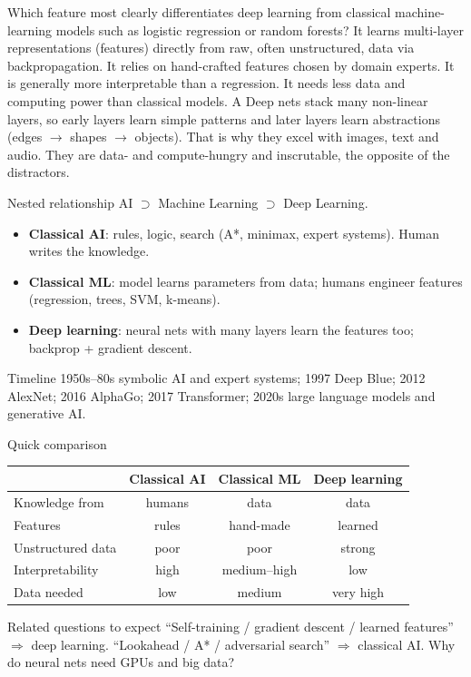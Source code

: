 {Which feature most clearly differentiates deep learning from classical machine-learning models such as logistic regression or random forests?}
{It learns multi-layer representations (features) directly from raw, often unstructured, data via backpropagation.}
{It relies on hand-crafted features chosen by domain experts.}
{It is generally more interpretable than a regression.}
{It needs less data and computing power than classical models.}
{A}
{Deep nets stack many non-linear layers, so early layers learn simple patterns and later layers learn abstractions (edges $\rightarrow$ shapes $\rightarrow$ objects). That is why they excel with images, text and audio. They are data- and compute-hungry and inscrutable, the opposite of the distractors.}

{\begin{block}{Nested relationship}
		AI $\supset$ Machine Learning $\supset$ Deep Learning.
		\begin{itemize}
			\item \textbf{Classical AI}: rules, logic, search (A*, minimax, expert systems). Human writes the knowledge.
			\item \textbf{Classical ML}: model learns parameters from data; humans engineer features (regression, trees, SVM, k-means).
			\item \textbf{Deep learning}: neural nets with many layers learn the features too; backprop + gradient descent.
	\end{itemize}\end{block}
	\begin{block}{Timeline}
		1950s--80s symbolic AI and expert systems; 1997 Deep Blue; 2012 AlexNet; 2016 AlphaGo; 2017 Transformer; 2020s large language models and generative AI.
\end{block}}
{\begin{block}{Quick comparison}
		\begin{center}\scriptsize
			\begin{tabular}{@{}lccc@{}}
				\toprule
				& Classical AI & Classical ML & Deep learning \\
				\midrule
				Knowledge from & humans & data & data \\
				Features & rules & hand-made & learned \\
				Unstructured data & poor & poor & strong \\
				Interpretability & high & medium--high & low \\
				Data needed & low & medium & very high \\
				\bottomrule
	\end{tabular}\end{center}\end{block}
	\begin{alertblock}{Related questions to expect}
		``Self-training / gradient descent / learned features'' $\Rightarrow$ deep learning. ``Lookahead / A* / adversarial search'' $\Rightarrow$ classical AI. Why do neural nets need GPUs and big data?
\end{alertblock}}

